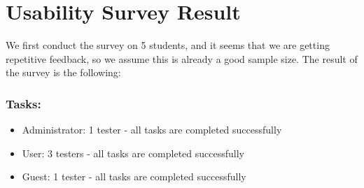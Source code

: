 \documentclass[12pt, titlepage]{article}
\begin{document}
\section{Usability Survey Result}\label{survey}
We first conduct the survey on 5 students, and it seems that we are getting repetitive feedback, so we assume this is already a good sample size. The result of the survey is the following:
\subsubsection{Tasks:}
\begin{itemize}
\item Administrator: 1 tester - all tasks are completed successfully 
\item User: 3 testers - all tasks are completed successfully
\item Guest: 1 tester - all tasks are completed successfully
\end{itemize}
\end{document}
